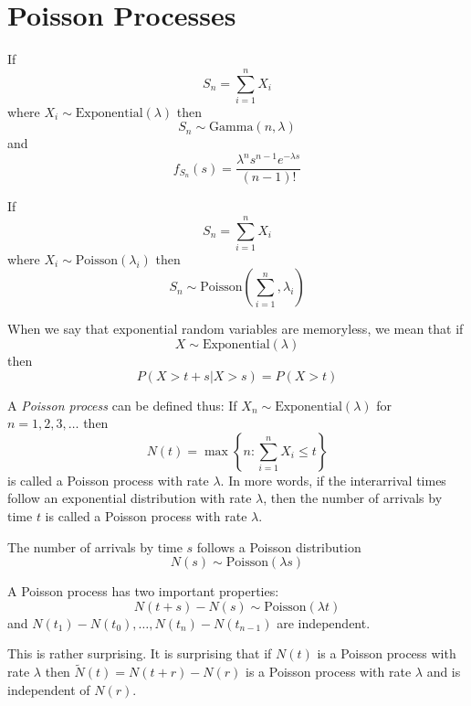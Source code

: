 \section{Poisson Processes}
If
\begin{equation}
    S_n = \sum_{i=1}^{n}X_i
\end{equation}
where $X_i \sim \text{Exponential}(\lambda)$
then
\begin{equation}
    S_n \sim \text{Gamma}(n, \lambda)
\end{equation}
and
\begin{equation}
    f_{S_n}(s) = \frac{\lambda^n s^{n-1} e^{-\lambda s}}{(n-1)!}
\end{equation}

If
\begin{equation}
    S_n = \sum_{i=1}^{n}X_i
\end{equation}
where $X_i \sim \text{Poisson}(\lambda_i)$
then
\begin{equation}
    S_n \sim \text{Poisson}(\sum_{i=1}^{n}, \lambda_i)
\end{equation}

When we say that exponential random variables
are memoryless, we mean that if
\begin{equation}
    X \sim \text{Exponential}(\lambda)
\end{equation}
then
\begin{equation}
    P(X > t + s | X > s) = P(X > t)
\end{equation}

A \emph{Poisson process} can be defined thus:
If $X_n \sim \text{Exponential}(\lambda)$ for
$n = 1, 2, 3, \dots$ then
\begin{equation}
    N(t) = \max \left\{n: \sum_{i=1}^{n} X_i \leq t\right\}
\end{equation}
is called a Poisson process with rate $\lambda$.
In more words, if the interarrival times follow
an exponential distribution with rate $\lambda$,
then the number of arrivals by time $t$ is called
a Poisson process with rate $\lambda$.

The number of arrivals by time $s$ follows
a Poisson distribution
\begin{equation}
    N(s) \sim \text{Poisson}(\lambda s)
\end{equation}

A Poisson process has two important
properties:
\begin{equation}
    N(t+s) - N(s) \sim \text{Poisson}(\lambda t)
\end{equation}
and
$N(t_1) - N(t_0), \dots, N(t_n) - N(t_{n-1})$ are
independent.

This is rather surprising. It is surprising that
if $N(t)$ is a Poisson process with rate $\lambda$
then $\tilde{N}(t) = N(t + r) - N(r)$ is a Poisson
process with rate $\lambda$ and is independent of $N(r)$.